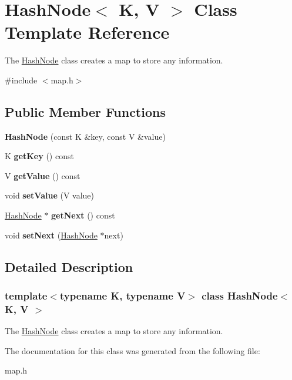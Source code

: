 \hypertarget{class_hash_node}{}\section{Hash\+Node$<$ K, V $>$ Class Template Reference}
\label{class_hash_node}


The \hyperlink{class_hash_node}{Hash\+Node} class creates a map to store any information.  




{\ttfamily \#include $<$map.\+h$>$}

\subsection*{Public Member Functions}
\begin{DoxyCompactItemize}
\item 
\mbox{\label{class_hash_node_a274d93360f64e94f76c260d604ce1fc0}} 
{\bfseries Hash\+Node} (const K \&key, const V \&value)
\item 
\mbox{\label{class_hash_node_afeb6b1e9b71eef17edfe6f9ebc9f47ba}} 
K {\bfseries get\+Key} () const
\item 
\mbox{\label{class_hash_node_a6d5ab91b69df97ad44caf19b518f8449}} 
V {\bfseries get\+Value} () const
\item 
\mbox{\label{class_hash_node_a6b52b6a71153980c851a35ad7dc0dbee}} 
void {\bfseries set\+Value} (V value)
\item 
\mbox{\label{class_hash_node_a644b981b90d041fd96cf19acf4b7a7cf}} 
\hyperlink{class_hash_node}{Hash\+Node} $\ast$ {\bfseries get\+Next} () const
\item 
\mbox{\label{class_hash_node_a1699b692e3cdf1a0807f227c4651beab}} 
void {\bfseries set\+Next} (\hyperlink{class_hash_node}{Hash\+Node} $\ast$next)
\end{DoxyCompactItemize}


\subsection{Detailed Description}
\subsubsection*{template$<$typename K, typename V$>$\newline
class Hash\+Node$<$ K, V $>$}

The \hyperlink{class_hash_node}{Hash\+Node} class creates a map to store any information. 

The documentation for this class was generated from the following file\+:\begin{DoxyCompactItemize}
\item 
map.\+h\end{DoxyCompactItemize}
